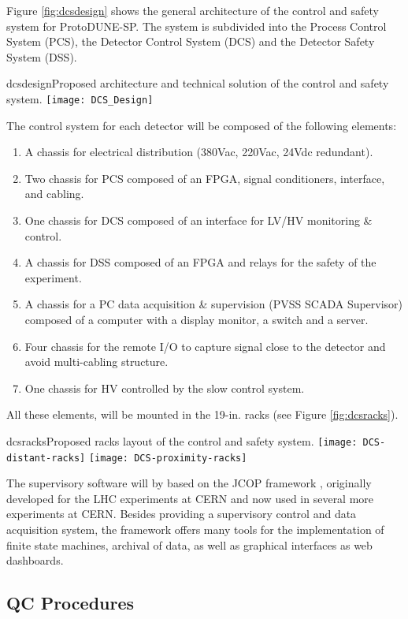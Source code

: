 Figure \ref{fig:dcsdesign} shows the general architecture of the control and safety system for ProtoDUNE-SP.
The system is subdivided into the Process Control System (PCS), the Detector Control System (DCS) and the Detector Safety System (DSS). 

\begin{cdrfigure}{dcsdesign}{Proposed architecture and technical solution of the control and safety system.}
\texttt{[image: DCS\_Design]}
\end{cdrfigure}

The control system for each detector will be composed of the following elements:
\begin{enumerate}
\item	A chassis for electrical distribution (380Vac, 220Vac, 24Vdc redundant).
\item	Two chassis for PCS composed of an FPGA, signal conditioners, interface, and cabling.
\item	One chassis for DCS  composed of an interface for LV/HV monitoring \& control.
\item	A chassis for DSS composed of an FPGA and relays for the safety of the experiment.
\item	A chassis for a PC data acquisition \& supervision (PVSS SCADA Supervisor) composed of a computer with a display monitor, a switch and a 
server.
\item	Four chassis for the remote I/O to capture signal close to the detector and avoid multi-cabling structure.
\item	One chassis for HV controlled by the slow control system.
\end{enumerate}
All these elements, will be mounted in the 19-in. racks (see Figure \ref{fig:dcsracks}).
\begin{cdrfigure}{dcsracks}{Proposed racks layout of the control and safety system.}
\texttt{[image: DCS-distant-racks]}
\texttt{[image: DCS-proximity-racks]}
\end{cdrfigure}

The supervisory software will by based on the JCOP framework , originally developed for the LHC experiments at CERN and now used in several more experiments at CERN. Besides providing a supervisory control and data acquisition system, the framework offers many tools for the implementation of finite state machines, archival of data, as well as graphical interfaces as web dashboards.

\subsection{QC Procedures}

